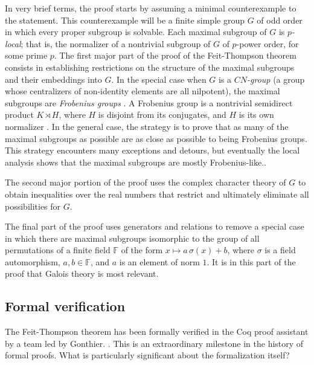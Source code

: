 \documentclass[brochure,english,12pt]{bourbaki}
\theoremstyle{plain}
\def\ring#1{{\mathbb{#1}}}
\begin{document}
In very brief terms, the proof starts by assuming a minimal counterexample to the statement.  This
counterexample will be a finite simple group $G$ of odd order in which every proper subgroup is solvable.
Each maximal subgroup of $G$ is {\it $p$-local}; that is, the normalizer of a nontrivial subgroup
of $G$ of $p$-power order, for some prime $p$.  The first major part of the proof of the Feit-Thompson theorem consists in establishing
restrictions on the structure of the maximal subgroups and their embeddings into $G$.
In the special case when $G$ is a {\it $CN$-group} (a group whose centralizers of non-identity elements are all nilpotent),
the maximal subgroups are {\it Frobenius groups} \cite{FHT}.  
A Frobenius group is
a nontrivial semidirect product $K\rtimes H$, where $H$ is disjoint from its conjugates, and $H$ is its own normalizer \cite[Th. 7.7]{gorenstein2007finite}.
 In the general case, the strategy is to prove that as many of the maximal subgroups as possible are as close as possible to
being Frobenius groups.  This strategy encounters many exceptions and detours, but eventually the local
analysis shows that the maximal subgroups are mostly  Frobenius-like.\cite[Sec. 16]{bender1994local}.


The second major portion of the proof uses the complex character theory of $G$ to obtain inequalities over the real numbers
that restrict and ultimately eliminate all possibilities for $G$. 

The final part of the proof uses generators and relations to remove a special case in which there
are maximal subgroups isomorphic to the group of all permutations of a finite field $\ring{F}$
of the form $x \mapsto a\, \sigma (x) + b$, where $\sigma$ is a field automorphism, $a,b\in\ring{F}$,
and $a$ is an element of norm $1$. It is in this part of the proof that Galois theory is most relevant.





\subsection{Formal verification}


The Feit-Thompson theorem has been formally verified in the Coq proof assistant by a team led by Gonthier.
\cite{gonthier2013machine}.  This is an extraordinary milestone in the history of formal proofs.
What is particularly significant about the formalization itself?
\end{document}
